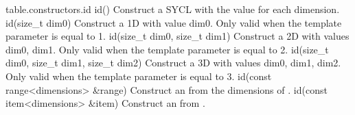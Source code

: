 {table.constructors.id}
  \addRow
    {id()}
    {
        Construct a SYCL  with the value  for each dimension.
    }
  \addRow
    {id(size_t dim0)}
    {
        Construct a 1D  with value dim0.
        Only valid when the template parameter  is equal
        to 1.
    }
  \addRow
    {id(size_t dim0, size_t dim1)}
    {
        Construct a 2D  with values dim0, dim1.
        Only valid when the template parameter  is equal
  to 2.
    }
  \addRow
    {id(size_t dim0, size_t dim1, size_t dim2)}
    {
        Construct a 3D  with values dim0, dim1, dim2. 
        Only valid when the template parameter  is equal
  to 3.
    }
  \addRow
    {id(const range<dimensions> \&range)}
    {
        Construct an  from the dimensions of .
    }
  \addRow
    {id(const item<dimensions> \&item)}
    {
        Construct an  from .
    }
\completeTable

